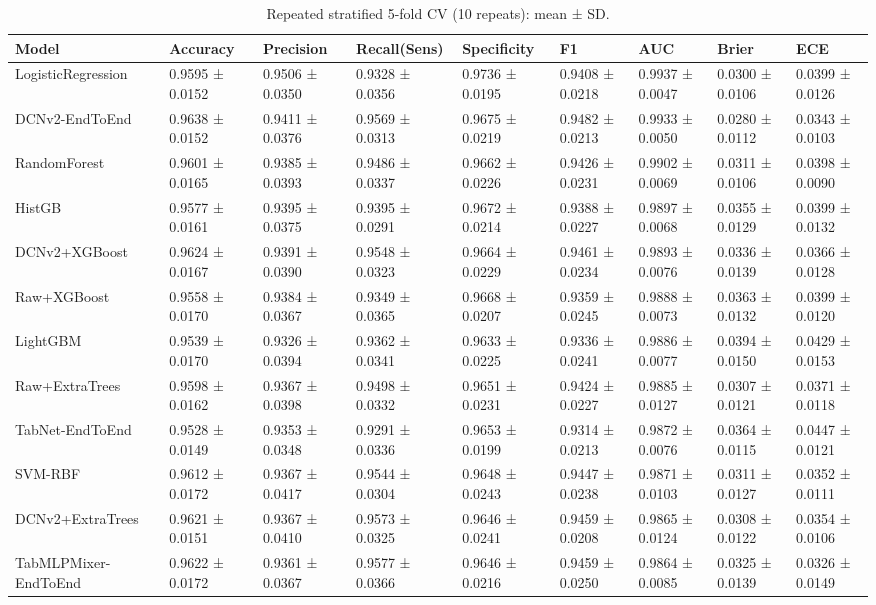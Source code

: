 \begin{table}
\caption{Repeated stratified 5-fold CV (10 repeats): mean ± SD.}
\label{tab:cv}
\begin{tabular}{lllllllll}
\toprule
Model & Accuracy & Precision & Recall(Sens) & Specificity & F1 & AUC & Brier & ECE \\
\midrule
LogisticRegression & 0.9595 ± 0.0152 & 0.9506 ± 0.0350 & 0.9328 ± 0.0356 & 0.9736 ± 0.0195 & 0.9408 ± 0.0218 & 0.9937 ± 0.0047 & 0.0300 ± 0.0106 & 0.0399 ± 0.0126 \\
DCNv2-EndToEnd & 0.9638 ± 0.0152 & 0.9411 ± 0.0376 & 0.9569 ± 0.0313 & 0.9675 ± 0.0219 & 0.9482 ± 0.0213 & 0.9933 ± 0.0050 & 0.0280 ± 0.0112 & 0.0343 ± 0.0103 \\
RandomForest & 0.9601 ± 0.0165 & 0.9385 ± 0.0393 & 0.9486 ± 0.0337 & 0.9662 ± 0.0226 & 0.9426 ± 0.0231 & 0.9902 ± 0.0069 & 0.0311 ± 0.0106 & 0.0398 ± 0.0090 \\
HistGB & 0.9577 ± 0.0161 & 0.9395 ± 0.0375 & 0.9395 ± 0.0291 & 0.9672 ± 0.0214 & 0.9388 ± 0.0227 & 0.9897 ± 0.0068 & 0.0355 ± 0.0129 & 0.0399 ± 0.0132 \\
DCNv2+XGBoost & 0.9624 ± 0.0167 & 0.9391 ± 0.0390 & 0.9548 ± 0.0323 & 0.9664 ± 0.0229 & 0.9461 ± 0.0234 & 0.9893 ± 0.0076 & 0.0336 ± 0.0139 & 0.0366 ± 0.0128 \\
Raw+XGBoost & 0.9558 ± 0.0170 & 0.9384 ± 0.0367 & 0.9349 ± 0.0365 & 0.9668 ± 0.0207 & 0.9359 ± 0.0245 & 0.9888 ± 0.0073 & 0.0363 ± 0.0132 & 0.0399 ± 0.0120 \\
LightGBM & 0.9539 ± 0.0170 & 0.9326 ± 0.0394 & 0.9362 ± 0.0341 & 0.9633 ± 0.0225 & 0.9336 ± 0.0241 & 0.9886 ± 0.0077 & 0.0394 ± 0.0150 & 0.0429 ± 0.0153 \\
Raw+ExtraTrees & 0.9598 ± 0.0162 & 0.9367 ± 0.0398 & 0.9498 ± 0.0332 & 0.9651 ± 0.0231 & 0.9424 ± 0.0227 & 0.9885 ± 0.0127 & 0.0307 ± 0.0121 & 0.0371 ± 0.0118 \\
TabNet-EndToEnd & 0.9528 ± 0.0149 & 0.9353 ± 0.0348 & 0.9291 ± 0.0336 & 0.9653 ± 0.0199 & 0.9314 ± 0.0213 & 0.9872 ± 0.0076 & 0.0364 ± 0.0115 & 0.0447 ± 0.0121 \\
SVM-RBF & 0.9612 ± 0.0172 & 0.9367 ± 0.0417 & 0.9544 ± 0.0304 & 0.9648 ± 0.0243 & 0.9447 ± 0.0238 & 0.9871 ± 0.0103 & 0.0311 ± 0.0127 & 0.0352 ± 0.0111 \\
DCNv2+ExtraTrees & 0.9621 ± 0.0151 & 0.9367 ± 0.0410 & 0.9573 ± 0.0325 & 0.9646 ± 0.0241 & 0.9459 ± 0.0208 & 0.9865 ± 0.0124 & 0.0308 ± 0.0122 & 0.0354 ± 0.0106 \\
TabMLPMixer-EndToEnd & 0.9622 ± 0.0172 & 0.9361 ± 0.0367 & 0.9577 ± 0.0366 & 0.9646 ± 0.0216 & 0.9459 ± 0.0250 & 0.9864 ± 0.0085 & 0.0325 ± 0.0139 & 0.0326 ± 0.0149 \\

\end{tabular}
\end{table}
